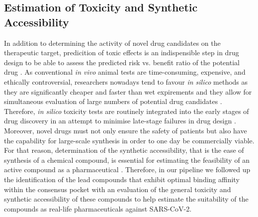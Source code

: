 \documentclass[11pt, letterpaper, titlepage]{article}
\renewcommand{\cite}{\parencite}
\begin{document}
\subsection{Estimation of Toxicity and Synthetic Accessibility}
In addition to determining the activity of novel drug candidates on the therapeutic target, predicition of toxic effects is an indispensible step in drug design to be able to assess the predicted risk vs. benefit ratio of the potential drug \cite{roncaglioni2013silico}. As conventional \textit{in vivo} animal tests are time-consuming, expensive, and ethically controversial, researchers nowadays tend to favour \textit{in silico} methods as they are significantly cheaper and faster than wet expirements and they allow for simultaneous evaluation of large numbers of potential drug candidates \cite{raies2016silico,roncaglioni2013silico}. Therefore, \textit{in silico} toxicity tests are routinely integrated into the early stages of drug discovery in an attempt to minimise late-stage failures in drug design \cite{dearden2003silico}. Moreover, novel drugs must not only ensure the safety of patients but also have the capability for large-scale synthesis in order to one day be commercially viable. For that reason, determination of the synthetic accessibility, that is the ease of synthesis of a chemical compound, is essential for estimating the feasibility of an active compound as a pharmaceutical \cite{boda2007structure}. Therefore, in our pipeline we followed up the identification of the lead compounds that exhibit optimal binding affinity within the consensus pocket with an evaluation of the general toxicity and synthetic accessibility of these compounds to help estimate the suitability of the compounds as real-life pharmaceuticals against \ac{SARS-CoV-2}.
\end{document}

